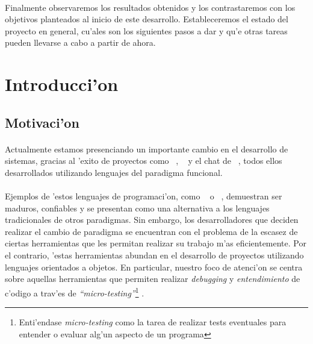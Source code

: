 \documentclass[a4paper]{article}
\begin{document}
\paragraph{}Finalmente observaremos los resultados obtenidos y los contrastaremos con los objetivos planteados al inicio de este desarrollo.  Estableceremos el estado del proyecto en general, cu'ales son los siguientes pasos a dar y qu'e otras tareas pueden llevarse a cabo a partir de ahora.

\newpage
\section{Introducci'on}
\subsection{Motivaci'on}
\begin{epigraphs}
\end{epigraphs}
\paragraph{}Actualmente estamos presenciando un importante cambio en el desarrollo de sistemas, gracias al 'exito de proyectos como ~\cite{couchdb}, ~\cite{ejabberd} y el chat de ~\cite{facebook}, todos ellos desarrollados utilizando lenguajes del paradigma funcional.
\paragraph{}Ejemplos de 'estos lenguajes de programaci'on, como ~\cite{haskell} o ~\cite{erlang}, demuestran ser maduros, confiables y se presentan como una alternativa a los lenguajes tradicionales de otros paradigmas.  Sin embargo, los desarrolladores que deciden realizar el cambio de paradigma se encuentran con el problema de la escasez de ciertas herramientas que les permitan realizar su trabajo m'as eficientemente.  Por el contrario, 'estas herramientas abundan en el desarrollo de proyectos utilizando lenguajes orientados a objetos.  En particular, nuestro foco de atenci'on se centra sobre aquellas herramientas que permiten realizar \textsl{debugging} y \textsl{entendimiento} de c'odigo a trav'es de \textsl{``micro-testing''}\footnote{Enti'endase \textsl{micro-testing} como la tarea de realizar tests eventuales para entender o evaluar alg'un aspecto de un programa} .
\end{document}
